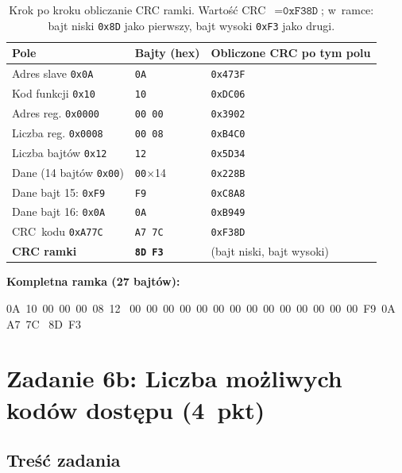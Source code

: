 \documentclass[12pt,a4paper]{article}
\begin{document}
\begin{table}[H]
\centering
\small
\begin{tabular}{lll}
\toprule
\textbf{Pole} & \textbf{Bajty (hex)} & \textbf{Obliczone CRC po tym polu} \\
\midrule
Adres slave \texttt{0x0A}       & \texttt{0A}    & \texttt{0x473F} \\
Kod funkcji \texttt{0x10}       & \texttt{10}    & \texttt{0xDC06} \\
Adres reg. \texttt{0x0000}      & \texttt{00 00} & \texttt{0x3902} \\
Liczba reg. \texttt{0x0008}     & \texttt{00 08} & \texttt{0xB4C0} \\
Liczba bajtów \texttt{0x12}     & \texttt{12}    & \texttt{0x5D34} \\
Dane (14 bajtów \texttt{0x00})  & \texttt{00}$\times$14 & \texttt{0x228B} \\
Dane bajt 15: \texttt{0xF9}     & \texttt{F9}    & \texttt{0xC8A8} \\
Dane bajt 16: \texttt{0x0A}     & \texttt{0A}    & \texttt{0xB949} \\
CRC~kodu \texttt{0xA77C}        & \texttt{A7 7C} & \texttt{0xF38D} \\
\midrule
\textbf{CRC ramki}              & \textbf{\texttt{8D F3}} & (bajt niski, bajt wysoki) \\
\bottomrule
\end{tabular}
\caption{Krok po kroku obliczanie CRC ramki. Wartość CRC~$= \texttt{0xF38D}$;
         w~ramce: bajt niski \texttt{0x8D} jako pierwszy, bajt wysoki \texttt{0xF3}
         jako drugi.}
\end{table}

\noindent\textbf{Kompletna ramka (27 bajtów):}
\begin{center}
\ttfamily
0A~10~00~00~00~08~12~
00~00~00~00~00~00~00~00~00~00~00~00~00~00~F9~0A~
A7~7C~
8D~F3
\end{center}

\section*{Zadanie 6b: Liczba możliwych kodów dostępu (4~pkt)}

\subsection*{Treść zadania}
\end{document}
